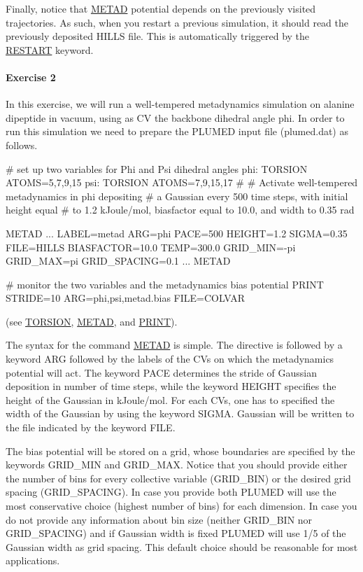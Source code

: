 Finally, notice that \hyperlink{METAD}{M\+E\+T\+A\+D} potential depends on the previously visited trajectories. As such, when you restart a previous simulation, it should read the previously deposited H\+I\+L\+L\+S file. This is automatically triggered by the \hyperlink{RESTART}{R\+E\+S\+T\+A\+R\+T} keyword.\hypertarget{munster_munster-exercise-2}{}\paragraph{Exercise 2}\label{munster_munster-exercise-2}
In this exercise, we will run a well-\/tempered metadynamics simulation on alanine dipeptide in vacuum, using as C\+V the backbone dihedral angle phi. In order to run this simulation we need to prepare the P\+L\+U\+M\+E\+D input file (plumed.\+dat) as follows.

\begin{DoxyVerb}# set up two variables for Phi and Psi dihedral angles 
phi: TORSION ATOMS=5,7,9,15
psi: TORSION ATOMS=7,9,15,17
#
# Activate well-tempered metadynamics in phi depositing 
# a Gaussian every 500 time steps, with initial height equal 
# to 1.2 kJoule/mol, biasfactor equal to 10.0, and width to 0.35 rad

METAD ...
LABEL=metad
ARG=phi
PACE=500
HEIGHT=1.2
SIGMA=0.35
FILE=HILLS
BIASFACTOR=10.0
TEMP=300.0
GRID_MIN=-pi
GRID_MAX=pi
GRID_SPACING=0.1
... METAD

# monitor the two variables and the metadynamics bias potential
PRINT STRIDE=10 ARG=phi,psi,metad.bias FILE=COLVAR\end{DoxyVerb}
 (see \hyperlink{TORSION}{T\+O\+R\+S\+I\+O\+N}, \hyperlink{METAD}{M\+E\+T\+A\+D}, and \hyperlink{PRINT}{P\+R\+I\+N\+T}).

The syntax for the command \hyperlink{METAD}{M\+E\+T\+A\+D} is simple. The directive is followed by a keyword A\+R\+G followed by the labels of the C\+Vs on which the metadynamics potential will act. The keyword P\+A\+C\+E determines the stride of Gaussian deposition in number of time steps, while the keyword H\+E\+I\+G\+H\+T specifies the height of the Gaussian in k\+Joule/mol. For each C\+Vs, one has to specified the width of the Gaussian by using the keyword S\+I\+G\+M\+A. Gaussian will be written to the file indicated by the keyword F\+I\+L\+E.

The bias potential will be stored on a grid, whose boundaries are specified by the keywords G\+R\+I\+D\+\_\+\+M\+I\+N and G\+R\+I\+D\+\_\+\+M\+A\+X. Notice that you should provide either the number of bins for every collective variable (G\+R\+I\+D\+\_\+\+B\+I\+N) or the desired grid spacing (G\+R\+I\+D\+\_\+\+S\+P\+A\+C\+I\+N\+G). In case you provide both P\+L\+U\+M\+E\+D will use the most conservative choice (highest number of bins) for each dimension. In case you do not provide any information about bin size (neither G\+R\+I\+D\+\_\+\+B\+I\+N nor G\+R\+I\+D\+\_\+\+S\+P\+A\+C\+I\+N\+G) and if Gaussian width is fixed P\+L\+U\+M\+E\+D will use 1/5 of the Gaussian width as grid spacing. This default choice should be reasonable for most applications.

